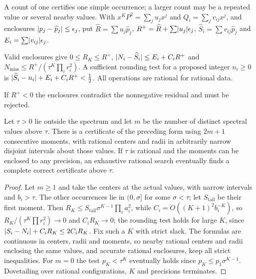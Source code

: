 A count of one certifies one simple occurrence; a larger count may be a repeated value or several
nearby values. With $x^KP^2=\sum_ju_jx^j$ and $Q_i=\sum_jv_{ij}x^j$, and enclosures
$\lvert p_j-\widehat p_j\rvert\le\epsilon_j$, put $\widehat R=\sum u_j\widehat p_j$,
$R^+=\widehat R+\sum\lvert u_j\rvert\epsilon_j$, $\widehat S_i=\sum v_{ij}\widehat p_j$ and
$E_i=\sum\lvert v_{ij}\rvert\epsilon_j$.

\begin{corollary}\label{li:cor:robust}
Valid enclosures give $0\le R_K\le R^+$, $\lvert N_i-\widehat S_i\rvert\le E_i+C_iR^+$ and
$N_{\mathrm{miss}}\le R^+/(\tau^K\prod_ir_i^2)$. A sufficient rounding test for a proposed integer
$n_i\ge0$ is $\lvert\widehat S_i-n_i\rvert+E_i+C_iR^+<\frac12$. All operations are rational for rational
data.
\end{corollary}

If $R^+<0$ the enclosures contradict the nonnegative residual and must be rejected.

\begin{theorem}\label{li:thm:eventual}
Let $\tau>0$ lie outside the spectrum and let $m$ be the number of distinct spectral values above
$\tau$. There is a certificate of the preceding form using $2m+1$ consecutive moments, with
rational centers and radii in arbitrarily narrow disjoint intervals about those values. If $\tau$ is
rational and the moments can be enclosed to any precision, an exhaustive rational search
eventually finds a complete correct certificate above $\tau$.
\end{theorem}

\begin{proof}
Let $m\ge1$ and take the centers at the actual values, with narrow intervals and $b_i>\tau$. The
other occurrences lie in $(0,\sigma]$ for some $\sigma<\tau$; let $S_{\mathrm{tail}}$ be their first
moment. Then $R_K\le S_{\mathrm{tail}}\sigma^{K-1}\prod_ia_i^2$, while $C_i=O((K+1)^2b_i^{-K})$, so
$R_K/(\tau^K\prod r_i^2)\to0$ and $C_iR_K\to0$; the rounding test holds for large $K$, since
$\lvert S_i-N_i\rvert+C_iR_K\le2C_iR_K$. Fix such a $K$ with strict slack. The formulas are continuous in
centers, radii and moments, so nearby rational centers and radii enclosing the same values, and
accurate rational enclosures, keep all strict inequalities. For $m=0$ the test $p_K<\tau^K$
eventually holds since $p_K\le p_1\sigma^{K-1}$. Dovetailing over rational configurations, $K$ and
precisions terminates.
\end{proof}

